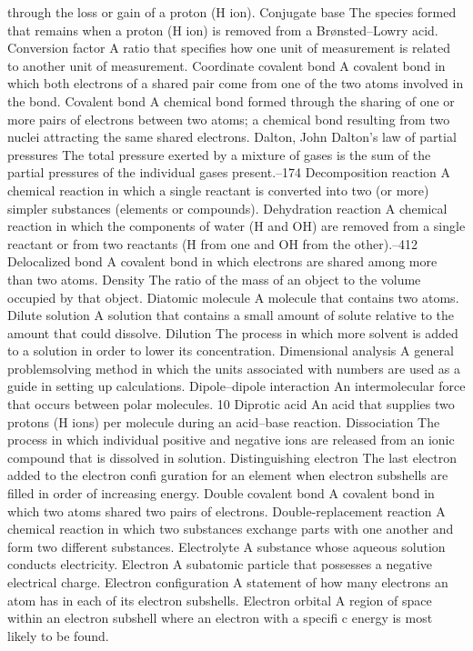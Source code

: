 \documentclass[10pt, roman]{article}
\begin{document}
through the loss or gain of a proton (H ion). Conjugate base The species formed that remains when a proton (H ion) is removed from a Brønsted–Lowry acid. Conversion factor A ratio that specifies how one unit of 
measurement is related to another unit of measurement. Coordinate covalent bond A covalent bond in which both electrons of a shared pair come from one of the two atoms involved in the bond. Covalent bond A 
chemical bond formed through the sharing of one or more pairs of electrons between two atoms; a chemical bond resulting from two nuclei attracting the same shared electrons. Dalton, John Dalton’s law of partial 
pressures The total pressure exerted by a mixture of gases is the sum of the partial pressures of the individual gases present.–174 Decomposition reaction A chemical reaction in which a single reactant is converted 
into two (or more) simpler substances (elements or compounds). Dehydration reaction A chemical reaction in which the components of water (H and OH) are removed from a single reactant or from two reactants (H from one 
and OH from the other).–412 Delocalized bond A covalent bond in which electrons are shared among more than two atoms. Density The ratio of the mass of an object to the volume occupied by that object. Diatomic molecule 
A molecule that contains two atoms. Dilute solution A solution that contains a small amount of solute relative to the amount that could dissolve. Dilution The process in which more solvent is added to a solution in 
order to lower its concentration. Dimensional analysis A general problemsolving method in which the units associated with numbers are used as a guide in setting up calculations. Dipole–dipole interaction An 
intermolecular force that occurs between polar molecules. 10 Diprotic acid An acid that supplies two protons (H ions) per molecule during an acid–base reaction. Dissociation The process in which individual positive 
and negative ions are released from an ionic compound that is dissolved in solution. Distinguishing electron The last electron added to the electron confi guration for an element when electron subshells are filled 
in order of increasing energy. Double covalent bond A covalent bond in which two atoms shared two pairs of electrons. Double-replacement reaction A chemical reaction in which two substances exchange parts with one 
another and form two different substances. Electrolyte A substance whose aqueous solution conducts electricity. Electron A subatomic particle that possesses a negative electrical charge. Electron configuration A 
statement of how many electrons an atom has in each of its electron subshells. Electron orbital A region of space within an electron subshell where an electron with a specifi c energy is most likely to be found. 
\end{document}
